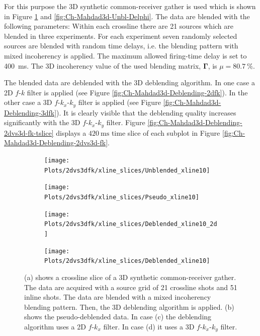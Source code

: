 For this purpose the 3D synthetic common-receiver gather is used which is shown in Figure \ref{fig:Ch-Mahdad3d-Unbl-Delphi_xline} and \ref{fig:Ch-Mahdad3d-Unbl-Delphi}. The data are blended with the following parameters: Within each crossline there are 21 sources which are blended in three experiments. For each experiment seven randomly selected sources are blended with random time delays, i.e. the blending pattern with mixed incoherency is applied. The maximum allowed firing-time delay is set to \SI{400}{\milli\second}. The 3D incoherency value of the used blending matrix, $\mathbf{\Gamma}$, is $\mu = \SI{80.7}{\percent}$. 

The blended data are deblended with the 3D deblending algorithm. In one case a 2D $f$-$k$ filter is applied (see Figure \ref{fig:Ch-Mahdad3d-Deblending-2dfk}). In the other case a 3D $f$-$k_x$-$k_y$ filter is applied (see Figure \ref{fig:Ch-Mahdad3d-Deblending-3dfk}). It is clearly visible that the deblending quality increases significantly with the 3D $f$-$k_x$-$k_y$ filter. Figure \ref{fig:Ch-Mahdad3d-Deblending-2dvs3d-fk-tslice} displays a $\SI{420}{\milli\second}$ time slice of each subplot in Figure \ref{fig:Ch-Mahdad3d-Deblending-2dvs3d-fk}.

\begin{figure}
	
	\centering
	\begin{subfigure}[t]{0.2\textwidth}
		\centering
		\texttt{[image: Plots/2dvs3dfk/xline\_slices/Unblended\_xline10]}
		\caption{}
		\label{fig:Ch-Mahdad3d-Unbl-Delphi_xline}
	\end{subfigure}
	\centering
	\begin{subfigure}[t]{0.2\textwidth}
		\texttt{[image: Plots/2dvs3dfk/xline\_slices/Pseudo\_xline10]}
		\caption{}
		\label{fig:Ch-Mahdad3d-Deblending-Pseudo-xline}
	\end{subfigure}
	\centering
	\begin{subfigure}[t]{0.2\textwidth}
		\texttt{[image: Plots/2dvs3dfk/xline\_slices/Deblended\_xline10\_2d]}
		\caption{}
		\label{fig:Ch-Mahdad3d-Deblending-2dfk_xline}
	\end{subfigure}
	\centering
	\begin{subfigure}[t]{0.2\textwidth}
		\texttt{[image: Plots/2dvs3dfk/xline\_slices/Deblended\_xline10]}
		\caption{}
		\label{fig:Ch-Mahdad3d-Deblending-3dfk_xline}
	\end{subfigure}
	
	\caption{(a) shows a crossline slice of a 3D synthetic common-receiver gather. The data are acquired with a source grid of 21 crossline shots and 51 inline shots. The data are blended with a mixed incoherency blending pattern. Then, the 3D deblending algorithm is applied. (b) shows the pseudo-deblended data. In case (c) the deblending algorithm uses a 2D $f$-$k_x$ filter. In case (d) it uses a 3D $f$-$k_x$-$k_y$ filter.}
	\label{fig:Ch-Mahdad3d-Deblending-2dvs3d-fk_xline}
	
\end{figure}

